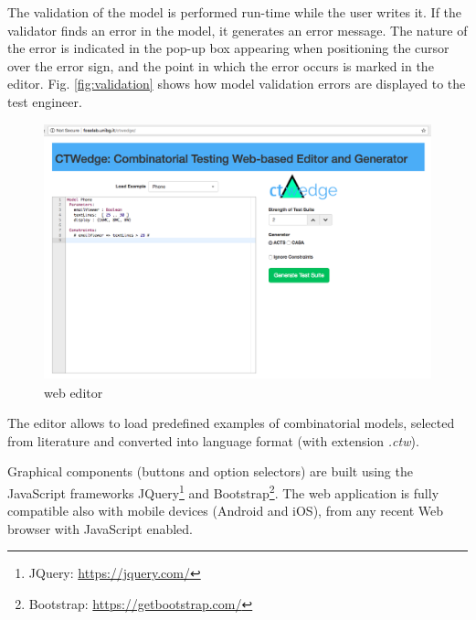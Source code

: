 \begin{tikzborder}{\cite{Gargantini16:validation}}
\begin{tikzborder}{\cite{gargantini_combinatorial_2017}}
\begin{tikzborder}{\cite{gargantini_combinatorial_2017}}
\begin{tikzborder}{\cite{garn2019}}
\begin{tikzborder}{\cite{arcaini2019achieving}}
\begin{tikzborder}{}
The validation of the model is performed run-time while the user writes it. If the validator finds an error in the model, it generates an error message. The nature of the error is indicated in the pop-up box appearing when positioning the cursor over the error sign, and the point in which the error occurs is marked in the editor. Fig. \ref{fig:validation} shows how model validation errors are displayed to the test engineer.
\end{tikzborder}
\begin{figure}[bt!]
	\centering
	\includegraphics[width=\textwidth,trim={0 10cm 0 0},clip]{images/editor2.png}
	\caption{\ctwedge web editor}\label{fig:editor}
\end{figure}

\begin{tikzborder}{}
The editor allows to load predefined examples of combinatorial models, selected from literature \cite{segall_using_2011} and converted into \ctwedge language format (with extension \textit{.ctw}).

Graphical components (buttons and option selectors) are built using the JavaScript frameworks JQuery\footnote{JQuery: \url{https://jquery.com/}}
and Bootstrap\footnote{Bootstrap: \url{https://getbootstrap.com/}}.
The web application is fully compatible also with mobile devices (Android and iOS), from any recent Web browser with JavaScript enabled.
\end{tikzborder}


\end{tikzborder}
\end{tikzborder}
\end{tikzborder}
\end{tikzborder}
\end{tikzborder}
